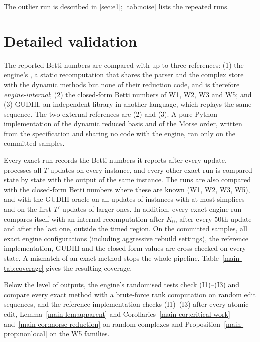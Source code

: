 The outlier run is described in \cref{sec:e1}; \cref{tab:noise} lists the
repeated runs.

\begin{table}[tbp]
  \centering
  \caption{Repeated identical runs: coefficients of variation of the median,
    amortised and p99 latency.}
  \label{tab:noise}
  \small
\end{table}

\section{Detailed validation}\label{sec:s-validation}


The reported Betti numbers are compared with up to three references: (1) the
engine's , a static recomputation that shares the parser and the
complex store with the dynamic methods but none of their reduction code, and is
therefore \emph{engine-internal}; (2) the closed-form Betti numbers of W1, W2, W3
and W5; and (3) GUDHI, an independent library in another language, which replays
the same sequence. The two external references are (2) and (3). A pure-Python
implementation of the dynamic reduced basis and of the Morse order, written from
the specification and sharing no code with the engine, ran only on the
\NumReferenceSamples{} committed samples.

Every exact run records the Betti numbers it reports after every update.
 processes all $T$ updates on every instance, and every other
exact run is compared state by state with the  output of the same
instance. The runs are also compared with the closed-form Betti numbers where
these are known (W1, W2, W3, W5), and with the GUDHI oracle on all updates of
instances with at most \NumGudhiFullLimit{} simplices and on the first $T'$
updates of larger ones. In addition, every exact engine run compares itself with
an internal recomputation after $K_0$, after every $50$th update and after the
last one, outside the timed region. On the \NumSamples{} committed samples, all
exact engine configurations (including aggressive rebuild settings), the
reference implementation, GUDHI and the closed-form values are cross-checked on
every state. A mismatch of an exact method stops the whole pipeline.
Table~\ref{main-tab:coverage} gives the resulting coverage.

Below the level of outputs, the engine's randomised tests check (I1)--(I3) and
compare every exact method with a brute-force rank computation on random edit
sequences, and the reference implementation checks (I1)--(I3) after every
atomic edit, Lemma~\ref{main-lem:apparent} and Corollaries~\ref{main-cor:critical-work} and~\ref{main-cor:morse-reduction} on random
complexes and Proposition~\ref{main-prop:nonlocal} on the W5 families.


